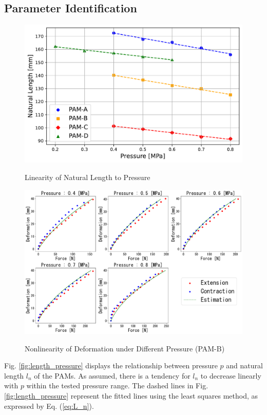 \subsection{Parameter Identification}
\begin{figure}[t]
    \hfill
    \begin{minipage}{\columnwidth}
        \centering
        \includegraphics[width=\columnwidth]{fig/length_pressure.pdf} 
        \caption{Linearity of Natural Length to Pressure}
        \label{fig:length_pressure}
        \vspace{1em} 
        \includegraphics[width=\columnwidth]{fig/20231124_5_4s_2d_ieeesensors1.pdf}
        \caption{Nonlinearity of Deformation under Different Pressure (PAM-B)}
        \label{fig:pam_b_static1}
    \end{minipage}
\end{figure}
Fig. \ref{fig:length_pressure} displays the relationship between pressure $p$ and natural length $l_n$ of the PAMs. As assumed, there is a tendency for $l_n$ to decrease linearly with $p$ within the tested pressure range. The dashed lines in Fig. \ref{fig:length_pressure} represent the fitted lines using the least squares method, as expressed by Eq. (\ref{eq:L_n}).
